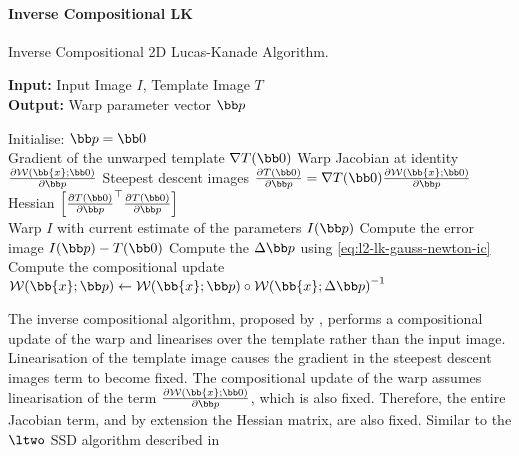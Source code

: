 \paragraph{Inverse Compositional LK}\label{subsubsec:lk-ic}
\begin{algorithm}[t]
\caption{Inverse Compositional 2D Lucas-Kanade Algorithm.}
\label{alg:lk_2d_ic}
    {\textbf{Input:} Input Image $I$, Template Image $T$} \\
    {\textbf{Output:} Warp parameter vector $\p$}  \\
    \begin{algorithmic}[1]
        \State{}Initialise: $\p = \zero$\\
        \State{}\quad Gradient of the unwarped template $\nabla T(\zero)$
        \State{}\quad Warp Jacobian at identity $\frac{\partial \mathcal{W}(\bb{x};\zero)}{\partial \p}$
        \State{}\quad Steepest descent images $\frac{\partial T(\zero)}{\partial \p} = \nabla T(\zero) \frac{\partial \mathcal{W}(\bb{x};\zero)}{\partial \p}$
        \State{}\quad Hessian $\left[ {\frac{\partial T(\zero)}{\partial \p}}^{\top} \frac{\partial T(\zero)}{\partial \p} \right]$ \\
        \While{$\norm{\Delta \p} > \epsilon$}
            \State{}Warp $I$ with current estimate of the parameters $I(\p)$
            \State{}Compute the error image $I(\p) - T(\zero)$
            \State{}Compute the $\Delta \p$ using \cref{eq:l2-lk-gauss-newton-ic}
            \State{}Compute the compositional update $\mathcal{W}(\bb{x};\p) \leftarrow \mathcal{W}(\bb{x};\p) \circ {\mathcal{W}(\bb{x};\Delta \p)}^{-1}$
        \EndWhile{}
    \end{algorithmic}
\end{algorithm}
The inverse compositional algorithm, proposed by \citet{baker2004lucas},
performs a compositional update of the warp and
linearises over the template rather than the input image. Linearisation of the
template image causes the gradient in the steepest descent images term to become
fixed. The compositional update of the warp assumes linearisation of the term
$\frac{\partial \mathcal{W}(\bb{x};\zero)}{\partial \p}$, which is also
fixed. Therefore, the entire Jacobian term, and by extension the Hessian matrix,
are also fixed. Similar to the $\ltwo$ SSD algorithm described in
